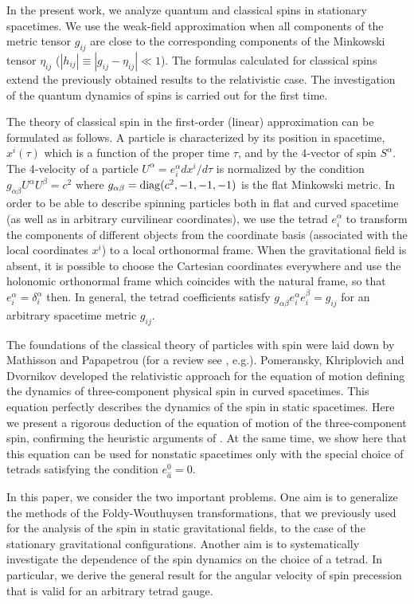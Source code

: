 \documentclass[preprint,showpacs,preprintnumbers,amsmath,amssymb]{revtex4}
\begin{document}
In the present work, we analyze quantum and classical spins in
stationary spacetimes. We use the weak-field approximation when all
components of the metric tensor $g_{ij}$ are close to the corresponding
components of the Minkowski tensor $\eta_{ij}$ ($|h_{ij}|\equiv|g_{ij}
-\eta_{ij}|\ll1$). The formulas calculated for classical spins extend
the previously obtained results to the relativistic case. The
investigation of the quantum dynamics of spins is carried out
for the first time.

The theory of classical spin in the first-order (linear) approximation
can be formulated as follows. A particle is characterized by its position
in spacetime, $x^i(\tau)$ which is a function of the proper time $\tau$,
and by the 4-vector of spin $S^\alpha$. The 4-velocity of a particle
$U^\alpha = e^\alpha_i dx^i/d\tau$ is normalized by the condition
$g_{\alpha\beta}U^\alpha U^\beta = c^2$ where $g_{\alpha\beta} = {\rm diag}
(c^2, -1, -1, -1)$ is the flat Minkowski metric. In order to be able to
describe spinning particles both in flat and curved spacetime (as well as
in arbitrary curvilinear coordinates), we use the tetrad $e^\alpha_i$ to
transform the components of different objects from the coordinate basis
(associated with the local coordinates $x^i$) to a local orthonormal
frame. When the gravitational field is absent, it is possible to choose
the Cartesian coordinates everywhere and use the holonomic orthonormal frame
which coincides with the natural frame, so that $e^\alpha_i = \delta^\alpha_i$
then. In general, the tetrad coefficients satisfy $g_{\alpha\beta}e^\alpha_i
e^\beta_i = g_{ij}$ for an arbitrary spacetime metric $g_{ij}$.

The foundations of the classical theory of particles with spin were laid down
by Mathisson and Papapetrou \cite{Mathisson,Papapetrou} (for a review see
\cite{corben}, e.g.).
Pomeransky, Khriplovich \cite{PK} and Dvornikov \cite{Dvornikov} developed
the relativistic approach for the equation of motion defining the dynamics
of three-component physical spin in curved spacetimes. This equation perfectly
describes the dynamics of the spin in static spacetimes. Here we present a
rigorous deduction of the equation of motion of the three-component spin,
confirming the heuristic arguments of \cite{PK}. At the same time, we show
here that this equation can be used for nonstatic spacetimes only with the
special choice of tetrads satisfying the condition $e^{0}_{\widehat{a}}=0$.

In this paper, we consider the two important problems. One aim is to generalize
the methods of the Foldy-Wouthuysen transformations, that we previously used for
the analysis of the spin in static gravitational fields, to the case of the
stationary gravitational configurations. Another aim is to systematically
investigate the dependence of the spin dynamics on the choice of a tetrad.
In particular, we derive the general result for the angular velocity
of spin precession that is valid for an arbitrary tetrad gauge.
\end{document}
